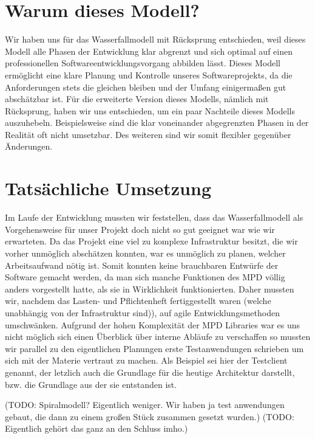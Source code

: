 \section{Warum dieses Modell?}
Wir haben uns für das Wasserfallmodell mit Rücksprung entschieden, weil dieses Modell alle Phasen der 
Entwicklung klar abgrenzt und sich optimal auf einen professionellen Softwareentwicklungsvorgang
abbilden lässt. Dieses Modell ermöglicht eine klare Planung und Kontrolle unseres Softwareprojekts,
da die Anforderungen stets die gleichen bleiben und der Umfang einigermaßen gut abschätzbar ist.
Für die erweiterte Version dieses Modells, nämlich mit Rücksprung, haben wir uns entschieden, um ein 
paar Nachteile dieses Modells auszuhebeln. Beispielsweise sind die klar voneinander abgegrenzten Phasen
in der Realität oft nicht umsetzbar. Des weiteren sind wir somit flexibler gegenüber Änderungen.
\section{Tatsächliche Umsetzung}
Im Laufe der Entwicklung mussten wir feststellen, dass das Wasserfallmodell als Vorgehensweise für unser
Projekt doch nicht so gut geeignet war wie wir erwarteten. Da das Projekt eine viel zu komplexe Infrastruktur
besitzt, die wir vorher unmöglich abschätzen konnten, war es unmöglich zu planen, welcher Arbeitsaufwand nötig ist.
Somit konnten keine brauchbaren Entwürfe der Software gemacht werden, da man sich manche Funktionen des MPD
völlig anders vorgestellt hatte, als sie in Wirklichkeit funktionierten. Daher mussten wir, nachdem
das Lasten- und Pflichtenheft fertiggestellt waren (welche unabhängig von der Infrastruktur sind)), auf agile
Entwicklungsmethoden umschwänken. Aufgrund der hohen Komplexität der MPD Libraries war es uns nicht möglich
sich einen Überblick über interne Abläufe zu verschaffen so mussten wir parallel zu den eigentlichen Planungen
erste Testanwendungen schrieben um sich mit der Materie vertraut zu machen.
Als Beispiel sei hier der Testclient genannt, der letzlich auch die Grundlage für die heutige
Architektur darstellt, bzw. die Grundlage aus der sie entstanden ist.


(TODO: Spiralmodell? Eigentlich weniger. Wir haben ja test anwendungen gebaut, die dann zu einem großen Stück zusammen gesetzt wurden.)
(TODO: Eigentlich gehört das ganz an den Schluss imho.)
